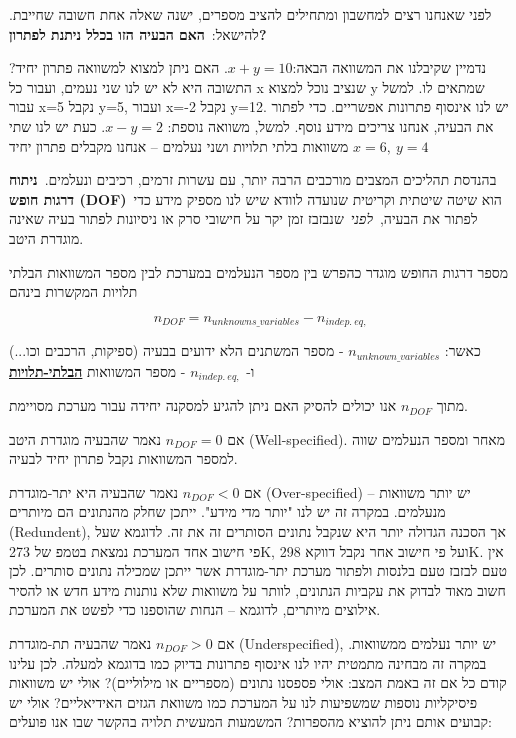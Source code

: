 \documentclass[
  hebrew,
  letterpaper,
  DIV=11,
  numbers=noendperiod]{scrreprt}
\begin{document}
.לפני שאנחנו רצים למחשבון ומתחילים להציב מספרים, ישנה שאלה אחת חשובה
שחייבת להישאל:~\textbf{האם הבעיה הזו בכלל ניתנת לפתרון?}

נדמיין שקיבלנו את המשוואה הבאה:\(x + y = 10\). האם ניתן למצוא למשוואה
פתרון יחיד? התשובה היא לא יש לנו שני נעמים, ועבור כל x שנציב נוכל למצוא
y שמתאים לו. למשל עבור x=5 נקבל y=5, ועבור x=-2 נקבל y=12. יש לנו אינסוף
פתרונות אפשריים. כדי לפתור את הבעיה, אנחנו צריכים מידע נוסף. למשל,
משוואה נוספת: \(x - y = 2\). כעת יש לנו שתי משוואות בלתי תלויות ושני
נעלמים -- אנחנו מקבלים פתרון יחיד \(x = 6,\ y = 4\)

בהנדסת תהליכים המצבים מורכבים הרבה יותר, עם עשרות זרמים, רכיבים
ונעלמים.~\textbf{ניתוח דרגות חופש (DOF)}~הוא שיטה שיטתית וקריטית שנועדה
לוודא שיש לנו מספיק מידע כדי לפתור את הבעיה,~\emph{לפני}~שנבזבז זמן יקר
על חישובי סרק או ניסיונות לפתור בעיה שאינה מוגדרת היטב.

מספר דרגות החופש מוגדר כהפרש בין מספר הנעלמים במערכת לבין מספר המשוואות
הבלתי תלויות המקשרות בינהם

\[n_{DOF} = n_{unknowns\_ variables} - n_{indep.\ eq,}\]

כאשר: \(n_{unknown\_ variables}\) - מספר המשתנים הלא ידועים בבעיה
(ספיקות, הרכבים וכו...)\\
ו- \(n_{indep.\ eq,}\) - מספר המשוואות \textbf{\ul{הבלתי-תלויות}}

מתוך \(n_{DOF}\) אנו יכולים להסיק האם ניתן להגיע למסקנה יחידה עבור מערכת
מסויימת.

אם \(n_{DOF} = 0\) נאמר שהבעיה מוגדרת היטב (Well-specified). מאחר ומספר
הנעלמים שווה למספר המשוואות נקבל פתרון יחיד לבעיה.

אם \(n_{DOF} < 0\) נאמר שהבעיה היא יתר-מוגדרת (Over-specified) -- יש
יותר משוואות מנעלמים. במקרה זה יש לנו "יותר מדי מידע". ייתכן שחלק
מהנתונים הם מיותרים (Redundent), אך הסכנה הגדולה יותר היא שנקבל נתונים
הסותרים זה את זה. לדוגמא שעל פי חישוב אחד המערכת נמצאת
בטמפ\textquotesingle{} של 273K, ועל פי חישוב אחר נקבל דווקא 298K. אין
טעם לבזבז טעם בלנסות ולפתור מערכת יתר-מוגדרת אשר ייתכן שמכילה נתונים
סותרים. לכן חשוב מאוד לבדוק את עקביות הנתונים, לוותר על משוואות שלא
נותנות מידע חדש או להסיר אילוצים מיותרים, לדוגמא -- הנחות שהוספנו כדי
לפשט את המערכת.

אם \(n_{DOF} > 0\) נאמר שהבעיה תת-מוגדרת (Underspecified), יש יותר
נעלמים ממשוואות. במקרה זה מבחינה מתמטית יהיו לנו אינסוף פתרונות בדיוק
כמו בדוגמא למעלה. לכן עלינו קודם כל אם זה באמת המצב: אולי פספסנו נתונים
(מספריים או מילוליים)? אולי יש משוואות פיסיקליות נוספות שמשפיעות לנו על
המערכת כמו משוואת הגזים האידיאליים? אולי יש קבועים אותם ניתן להוציא
מהספרות? המשמעות המעשית תלויה בהקשר שבו אנו פועלים:
\end{document}
